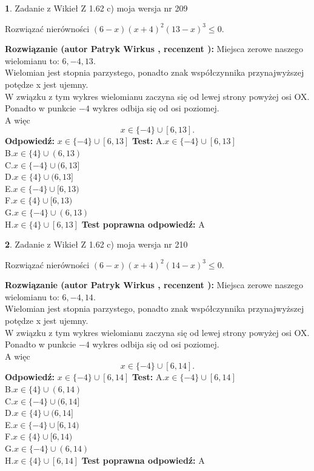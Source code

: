 \documentclass[12pt, a4paper]{article}
\theoremstyle{definition} %
\newtheorem{zad}{}
\newcommand{\zadStart}[1]{\begin{zad}#1\newline}
\newcommand{\zadStop}{\end{zad}}
\newcommand{\rozwStart}[2]{\noindent \textbf{Rozwiązanie (autor #1 , recenzent #2): }\newline}
\newcommand{\rozwStop}{\newline}
\newcommand{\odpStart}{\noindent \textbf{Odpowiedź:}\newline}
\newcommand{\odpStop}{\newline}
\newcommand{\testStart}{\noindent \textbf{Test:}\newline}
\newcommand{\testStop}{\newline}
\newcommand{\kluczStart}{\noindent \textbf{Test poprawna odpowiedź:}\newline}
\newcommand{\kluczStop}{\newline}
\begin{document}
\zadStart{Zadanie z Wikieł Z 1.62 c) moja wersja nr 209}

Rozwiązać nierówności $(6-x)(x+4)^{2}(13-x)^{3}\le0$.
\zadStop
\rozwStart{Patryk Wirkus}{}
Miejsca zerowe naszego wielomianu to: $6, -4, 13$.\\
Wielomian jest stopnia parzystego, ponadto znak współczynnika przy\linebreak najwyższej potędze x jest ujemny.\\ W związku z tym wykres wielomianu zaczyna się od lewej strony powyżej osi OX.\\
Ponadto w punkcie $-4$ wykres odbija się od osi poziomej.\\
A więc $$x \in \{-4\} \cup [6,13].$$
\rozwStop
\odpStart
$x \in \{-4\} \cup [6,13]$
\odpStop
\testStart
A.$x \in \{-4\} \cup [6,13]$\\
B.$x \in \{4\} \cup (6,13)$\\
C.$x \in \{-4\} \cup (6,13]$\\
D.$x \in \{4\} \cup (6,13]$\\
E.$x \in \{-4\} \cup [6,13)$\\
F.$x \in \{4\} \cup [6,13)$\\
G.$x \in \{-4\} \cup (6,13)$\\
H.$x \in \{4\} \cup [6,13]$
\testStop
\kluczStart
A
\kluczStop



\zadStart{Zadanie z Wikieł Z 1.62 c) moja wersja nr 210}

Rozwiązać nierówności $(6-x)(x+4)^{2}(14-x)^{3}\le0$.
\zadStop
\rozwStart{Patryk Wirkus}{}
Miejsca zerowe naszego wielomianu to: $6, -4, 14$.\\
Wielomian jest stopnia parzystego, ponadto znak współczynnika przy\linebreak najwyższej potędze x jest ujemny.\\ W związku z tym wykres wielomianu zaczyna się od lewej strony powyżej osi OX.\\
Ponadto w punkcie $-4$ wykres odbija się od osi poziomej.\\
A więc $$x \in \{-4\} \cup [6,14].$$
\rozwStop
\odpStart
$x \in \{-4\} \cup [6,14]$
\odpStop
\testStart
A.$x \in \{-4\} \cup [6,14]$\\
B.$x \in \{4\} \cup (6,14)$\\
C.$x \in \{-4\} \cup (6,14]$\\
D.$x \in \{4\} \cup (6,14]$\\
E.$x \in \{-4\} \cup [6,14)$\\
F.$x \in \{4\} \cup [6,14)$\\
G.$x \in \{-4\} \cup (6,14)$\\
H.$x \in \{4\} \cup [6,14]$
\testStop
\kluczStart
A
\kluczStop
\end{document}
